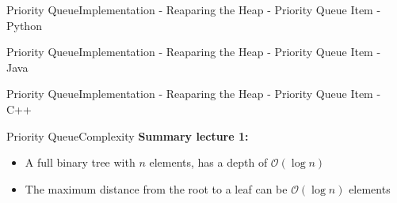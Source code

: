 
\begin{frame}{Priority Queue}{Implementation - Reaparing the Heap -
    Priority Queue Item - Python}
  
\end{frame}


\begin{frame}{Priority Queue}{Implementation - Reaparing the Heap -
    Priority Queue Item - Java}
  
\end{frame}


\begin{frame}{Priority Queue}{Implementation - Reaparing the Heap -
    Priority Queue Item - C++}
  
\end{frame}


\begin{frame}{Priority Queue}{Complexity}
  \textbf{Summary lecture 1:}
  \begin{itemize}
    \item
      A full binary tree with $n$ elements, has a {\color{Mittel-Blau}depth} of
      $\mathcal{O}(\log n)$
    \item
      The maximum distance from the root to a leaf can be
      $\mathcal{O}(\log n)$ elements
  \end{itemize}
\end{frame}


